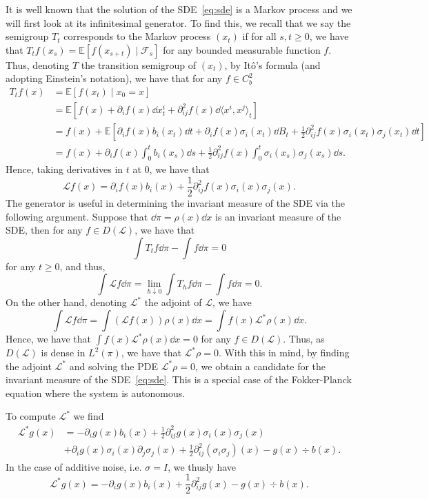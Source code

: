 \documentclass[]{article}
\theoremstyle{definition}
\theoremstyle{definition}
\begin{document}
It is well known that the solution of the SDE~\eqref{eq:sde} is a Markov process and we will first 
look at its infinitesimal generator. To find this, we recall that we say the semigroup \(T_t\) corresponds 
to the Markov process \((x_t)\) if for all \(s, t \ge 0\), we have that 
\(T_t f(x_s) = \mathbb{E}[f(x_{s + t}) \mid \mathcal{F}_s]\) for any bounded measurable function \(f\).
Thus, denoting \(T\) the transition semigroup of \((x_t)\), by It\^o's formula (and adopting Einstein's notation), 
we have that for any \(f \in C^2_b\)
\begin{align*}
  T_t f(x) & = \mathbb{E}[f(x_t) \mid x_0 = x] \\
  & = \mathbb{E}\left[f(x) + \partial_i f(x) \dd x_t^i + \partial_{ij}^2 f(x) \dd \langle x^i, x^j\rangle_t\right]\\
  & = f(x) + \mathbb{E}\left[\partial_i f(x) b_i(x_t) \dd t + \partial_i f(x) \sigma_i(x_t) \dd B_t + 
    \frac{1}{2} \partial_{ij}^2 f(x) \sigma_i(x_t)\sigma_j(x_t) \dd t\right]\\
  & = f(x) + \partial_i f(x) \int_0^t b_i(x_s) \dd s + \frac{1}{2} \partial_{ij}^2 f(x) \int_0^t \sigma_i(x_s)\sigma_j(x_s) \dd s.
\end{align*}
Hence, taking derivatives in \(t\) at \(0\), we have that 
\begin{equation}\label{eq:gen}
  \mathcal{L}f(x) = \partial_i f(x) b_i(x) + \frac{1}{2}\partial_{ij}^2 f(x) \sigma_i(x) \sigma_j(x).
\end{equation}
The generator is useful in determining the invariant measure of the SDE via the following argument. Suppose that 
\(\dd \pi = \rho(x) \dd x\) is an invariant measure of the SDE, then for any \(f \in D(\mathcal{L})\), 
we have that
\[\int T_t f \dd \pi - \int f \dd \pi = 0\]
for any \(t \ge 0\), and thus, 
\[\int \mathcal{L}f \dd \pi = \lim_{h \downarrow 0} \int T_h f \dd \pi - \int f \dd \pi = 0.\]
On the other hand, denoting \(\mathcal{L}^*\) the adjoint of \(\mathcal{L}\), we have
\[\int \mathcal{L}f \dd \pi = \int (\mathcal{L}f(x)) \rho(x) \dd x = \int f(x) \mathcal{L}^* \rho(x) \dd x.\]
Hence, we have that \(\int f(x) \mathcal{L}^* \rho(x) \dd x = 0\) for any \(f \in D(\mathcal{L})\). Thus, 
as \(D(\mathcal{L})\) is dense in \(L^2(\pi)\), we have that \(\mathcal{L}^* \rho = 0\). With this in mind, 
by finding the adjoint \(\mathcal{L}^*\) and solving the PDE \(\mathcal{L}^* \rho = 0\), we obtain a 
candidate for the invariant measure of the SDE~\eqref{eq:sde}. This is a special case of the Fokker-Planck 
equation where the system is autonomous.

To compute \(\mathcal{L}^*\) we find 
\begin{align*}
  \mathcal{L}^* g(x) &= - \partial_i g(x) b_i(x) + \frac{1}{2} \partial_{ij}^2 g(x) \sigma_i(x) \sigma_j(x)\\
  & + \partial_i g(x) \sigma_i(x) \partial_j\sigma_j(x) + \frac{1}{2} \partial_{ij}^2(\sigma_i \sigma_j)(x) - g(x)\div b(x).
\end{align*}
In the case of additive noise, i.e. \(\sigma = I\), we thusly have 
\[\mathcal{L}^* g(x) = - \partial_i g(x) b_i(x) + \frac{1}{2} \partial_{ij}^2 g(x) - g(x) \div b(x).\]
\end{document}
